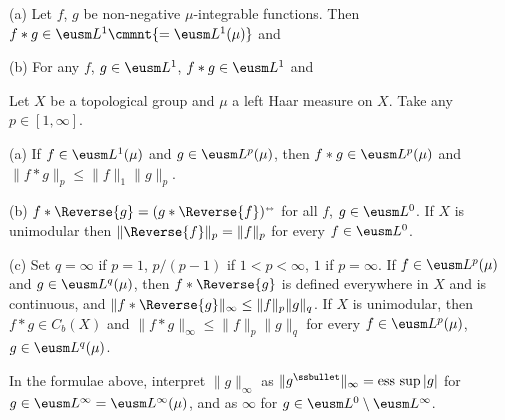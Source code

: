 (a) Let $f$, $g$ be non-negative
$\mu$-integrable functions.   Then
$f*g\in\eusm L^1\cmmnt{=\eusm L^1(\mu)}$ and


(b) For any $f$, $g\in\eusm L^1$, $f*g\in\eusm L^1$ and



 Let $X$ be a topological group and $\mu$ a
left Haar measure on $X$.   Take any $p\in[1,\infty]$.

(a) If $f\in\eusm L^1(\mu)$ and $g\in\eusm L^p(\mu)$, then
$f*g\in\eusm L^p(\mu)$ and $\|f*g\|_p\le\|f\|_1\|g\|_p$.

(b) $f*\Reverse{g}=(g*\Reverse{f})\ssplrarrow$ for all $f$,
$g\in\eusm L^0$.   If $X$
is unimodular then $\|\Reverse{f}\|_p=\|f\|_p$ for every $f\in\eusm L^0$.

(c) Set $q=\infty$ if $p=1$, $p/(p-1)$ if $1<p<\infty$, $1$ if
$p=\infty$.   If $f\in\eusm L^p(\mu)$ and $g\in\eusm L^q(\mu)$, then
$f*\Reverse{g}$ is defined everywhere in $X$ and is continuous, and
$\|f*\Reverse{g}\|_{\infty}\le\|f\|_p\|g\|_q$.   If $X$ is unimodular, then
$f*g\in C_b(X)$ and $\|f*g\|_{\infty}\le\|f\|_p\|g\|_q$ for every
$f\in\eusm L^p(\mu)$, $g\in\eusm L^q(\mu)$.

\medskip

 In the formulae above, interpret $\|g\|_{\infty}$
as $\|g^{\ssbullet}\|_{\infty}=\esssup|g|$ for
$g\in\eusm L^{\infty}=\eusm L^{\infty}(\mu)$,
and as $\infty$ for $g\in\eusm L^0\setminus\eusm L^{\infty}$.

